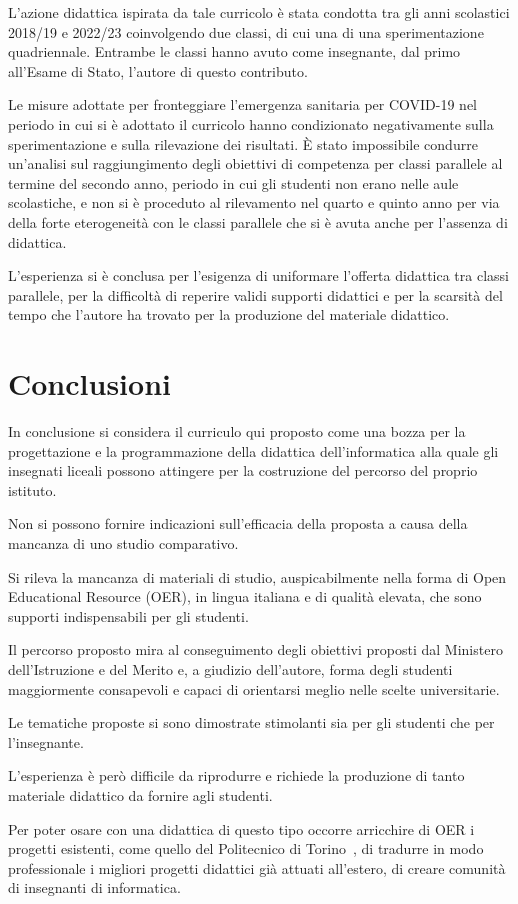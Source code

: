 \documentclass[a4paper]{easychair}
\begin{document}
L'azione didattica ispirata da tale curricolo è stata condotta tra gli anni scolastici
2018/19 e 2022/23 coinvolgendo due classi, di cui una di una sperimentazione quadriennale.
Entrambe le classi hanno avuto come insegnante, dal primo all'Esame di Stato,
l'autore di questo contributo.

Le misure adottate per fronteggiare l'emergenza sanitaria per COVID-19 nel periodo in cui
si è adottato il curricolo hanno condizionato negativamente sulla sperimentazione e sulla
rilevazione dei risultati.
È stato impossibile condurre un'analisi sul raggiungimento degli obiettivi di competenza per classi
parallele al termine del secondo anno, periodo in cui gli studenti non erano nelle aule scolastiche,
e non si è proceduto al rilevamento nel quarto e quinto anno per via della forte eterogeneità con le
classi parallele che si è avuta anche per l'assenza di didattica.

L'esperienza si è conclusa per l'esigenza di uniformare l'offerta didattica tra classi parallele,
per la difficoltà di reperire validi supporti didattici e per la scarsità del tempo che l'autore
ha trovato per la produzione del materiale didattico.

\section{Conclusioni}

In conclusione si considera il curriculo qui proposto come una
bozza per la progettazione e la programmazione della didattica dell'informatica %
alla quale gli insegnati liceali possono attingere per la costruzione del percorso
del proprio istituto.

Non si possono fornire indicazioni sull'efficacia della proposta a causa della mancanza di uno studio
comparativo.

Si rileva la mancanza di materiali di studio, auspicabilmente nella forma di Open Educational Resource (OER),
in lingua italiana e di qualità elevata, che sono supporti indispensabili per gli studenti.


Il percorso proposto mira al conseguimento degli obiettivi proposti dal Ministero
dell'Istruzione e del Merito e, a giudizio dell'autore, forma degli studenti
maggiormente consapevoli e capaci di orientarsi meglio nelle scelte universitarie.

Le tematiche proposte si sono dimostrate stimolanti sia per gli studenti che per
l'insegnante.

L'esperienza è però difficile da riprodurre e richiede la produzione di tanto materiale
didattico da fornire agli studenti.

Per poter osare con una didattica di questo tipo occorre arricchire di OER i progetti
esistenti, come quello del Politecnico di Torino~\cite{fare}, di tradurre in modo
professionale i migliori progetti didattici già attuati all'estero, di creare
comunità di insegnanti di informatica.

\label{sect:bib}
%
%
%
\printbibliography
\end{document}
